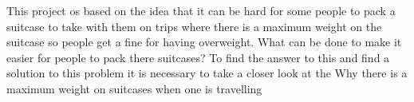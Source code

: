 This project os based on the idea that it can be hard for some people to pack a suitcase to take with them on trips where there is a maximum weight on the suitcase so people get a fine for having overweight. What can be done to make it easier for people to pack there suitcases? To find the answer to this and find a solution to this problem it is necessary to take a closer look at the Why there is a maximum weight on suitcases when one is travelling